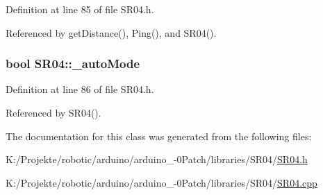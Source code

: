 Definition at line 85 of file SR04.h.

Referenced by getDistance(), Ping(), and SR04().\hypertarget{class_s_r04_dee423aa1137931b46b8eab5b0a0c2ad}{
\subsubsection[\_\-autoMode]{\setlength{\rightskip}{0pt plus 5cm}bool {\bf SR04::\_\-autoMode}}}
\label{class_s_r04_dee423aa1137931b46b8eab5b0a0c2ad}




Definition at line 86 of file SR04.h.

Referenced by SR04().

The documentation for this class was generated from the following files:\begin{CompactItemize}
\item 
K:/Projekte/robotic/arduino/arduino\_-0Patch/libraries/SR04/\hyperlink{_s_r04_8h}{SR04.h}\item 
K:/Projekte/robotic/arduino/arduino\_-0Patch/libraries/SR04/\hyperlink{_s_r04_8cpp}{SR04.cpp}\end{CompactItemize}
